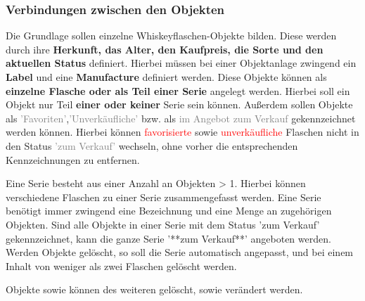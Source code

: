 			\subsubsection{Verbindungen zwischen den Objekten \cite{projektantrag.holzhaeuser}}
			Die Grundlage sollen einzelne Whiskeyflaschen-Objekte bilden. Diese werden durch ihre \textbf{Herkunft, das Alter, den Kaufpreis, die Sorte und den aktuellen Status} definiert. Hierbei müssen bei einer Objektanlage zwingend ein \textbf{Label} und eine \textbf{Manufacture} definiert werden. Diese Objekte können als \textbf{einzelne Flasche oder als Teil einer Serie} angelegt werden. Hierbei soll ein Objekt nur Teil \textbf{einer oder keiner} Serie sein können. Außerdem sollen Objekte als \textcolor{gray}{'Favoriten'},\textcolor{gray}{'Unverkäufliche'} bzw. als \textcolor{gray}{im Angebot zum Verkauf} gekennzeichnet werden können. Hierbei können \textcolor{red}{favorisierte} sowie \textcolor{red}{unverkäufliche} Flaschen nicht in den Status \textcolor{gray}{'zum Verkauf'} wechseln, ohne vorher die entsprechenden Kennzeichnungen zu entfernen.
			
			Eine Serie besteht aus einer Anzahl an Objekten > 1. Hierbei können verschiedene Flaschen zu einer Serie zusammengefasst werden. Eine Serie benötigt immer zwingend eine Bezeichnung und eine Menge an zugehörigen Objekten. Sind alle Objekte in einer Serie mit dem Status 'zum Verkauf' gekennzeichnet, kann die ganze Serie '**zum Verkauf**' angeboten werden. Werden Objekte gelöscht, so soll die Serie automatisch angepasst, und bei einem Inhalt von weniger als zwei Flaschen gelöscht werden.
			
			Objekte sowie können des weiteren gelöscht, sowie verändert werden.
	
